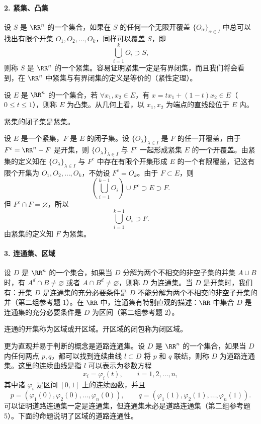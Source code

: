 \paragraph{2. 紧集、凸集}
设 $S$ 是 $\RR^n$ 的一个集合，如果在 $S$ 的任何一个无限开覆盖 $\{O_\alpha\}_{\alpha\in I}$ 中总可以找出有限个开集 $O_1,O_2,\ldots,O_k$，同样可以覆盖 $S$，即
\[
  \bigcup_{i=1}^k O_i\supset S,
\]
则称 $S$ 是 $\RR^n$ 的一个紧集。容易证明紧集一定是有界闭集，而且我们将会看到，在 $\RR^n$ 中紧集与有界闭集的定义是等价的（紧性定理）。

设 $E$ 是 $\RR^n$ 的一个集合，若 $\forall x_1,x_2\in E$，有 $x=tx_1+(1-t)x_2\in E$（$0\leq t\leq1$），则称 $E$ 为凸集。从几何上看，以 $x_1,x_2$ 为端点的直线段位于 $E$ 内。

\begin{xexample}[17.1.3]
紧集的闭子集是紧集。
\end{xexample}
\begin{xproof}
设 $E$ 是一个紧集，$F$ 是 $E$ 的闭子集。设 $\{O_\lambda\}_{\lambda\in I}$ 是 $F$ 的任一开覆盖，由于 $F^c=\RR^n-F$ 是开集，则 $\{O_\lambda\}_{\lambda\in I}$ 与 $F^c$ 一起形成紧集 $E$ 的一个开覆盖。由紧集的定义知在 $\{O_\lambda\}_{\lambda\in I}$ 与 $F^c$ 中存在有限个开集形成 $E$ 的一个有限覆盖，记这有限个开集为 $O_1,O_2,\ldots,O_k$，不妨设 $F^c=O_k$。由于 $F\subset E$，则
\[
  \left(\bigcup_{i=1}^{k-1}O_i\right)\cup F^c\supset E\supset F.
\]
但 $F^c\cap F=\varnothing$，所以
\[
  \bigcup_{i=1}^{k-1}O_i\supset F.
\]
由紧集的定义知 $F$ 为紧集。
\end{xproof}

\paragraph{3. 连通集、区域}
设 $D$ 是 $\RR^n$ 的一个集合，如果当 $D$ 分解为两个不相交的非空子集的并集 $A\cup B$ 时，有 $A^d\cap B\neq\varnothing$ 或者 $A\cap B^d\neq\varnothing$，则称 $D$ 为连通集。当 $D$ 是开集时，我们有：开集 $D$ 是连通集的充分必要条件是 $D$ 不能分解为两个不相交的非空子开集的并（第二组参考题 1）。在 $\RR$ 中，连通集有特别直观的描述：$\RR$ 中集合 $D$ 是连通集的充分必要条件是 $D$ 为区间（第二组参考题 2）。

连通的开集称为区域或开区域。开区域的闭包称为闭区域。

更为直观并易于判断的概念是道路连通集。设 $D$ 是 $\RR^n$ 的一个集合，如果当 $D$ 内任何两点 $p,q$，都可以找到连续曲线 $l\subset D$ 将 $p$ 和 $q$ 联结，则称 $D$ 为道路连通集。这里的连续曲线是指 $l$ 可以表示为参数方程
\[
  x_i=\varphi_i(t),\qquad i=1,2,\ldots,n,
\]
其中诸 $\varphi_i$ 是区间 $[0,1]$ 上的连续函数，并且
\[
  p=(\varphi_1(0),\varphi_2(0),\ldots,\varphi_n(0)),\qquad
  q=(\varphi_1(1),\varphi_2(1),\ldots,\varphi_n(1)).
\]
可以证明道路连通集一定是连通集，但连通集未必是道路连通集（第二组参考题 5）。下面的命题说明了区域的道路连通性。

